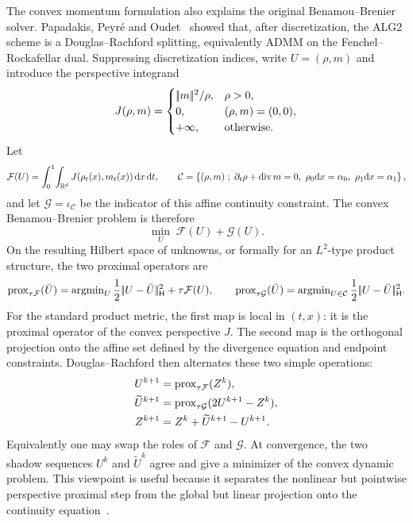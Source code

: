 The convex momentum formulation also explains the original Benamou--Brenier solver. Papadakis, Peyr\'e and Oudet~\cite{FPapPeyOud13} showed that, after discretization, the ALG2 scheme is a Douglas--Rachford splitting, equivalently ADMM on the Fenchel--Rockafellar dual. Suppressing discretization indices, write $U=(\rho,m)$ and introduce the perspective integrand
\[
	J(\rho,m)=
	\begin{cases}
		|\!| m |\!|^2/\rho, & \rho>0,\\
		0, & (\rho,m)=(0,0),\\
		+\infty, & \text{otherwise}.
	\end{cases}
\]
Let
\[
	\mathcal F(U)=\int_0^1\!\int_{\mathbb{R}^d}J(\rho_t(x),m_t(x))\,\mathrm{d} x\,\mathrm{d} t,
	\qquad
	\mathcal C=\left\{ (\rho,m) \;;\; \partial_t\rho+\operatorname{div} m=0,\ \rho_0\mathrm{d} x=\alpha_0,\ \rho_1\mathrm{d} x=\alpha_1 \right\},
\]
and let $\mathcal G=\iota_{\mathcal C}$ be the indicator of this affine continuity constraint. The convex Benamou--Brenier problem is therefore
\[
	\min_U\; \mathcal F(U)+\mathcal G(U).
\]
On the resulting Hilbert space of unknowns, or formally for an $L^2$-type product structure, the two proximal operators are
\[
	\operatorname{prox}_{\tau\mathcal F}(\bar U)
	=
	\operatorname{argmin}_U
	\frac12|\!| U-\bar U |\!|_{\mathsf H}^2+\tau\mathcal F(U),
	\qquad
	\operatorname{prox}_{\tau\mathcal G}(\bar U)
	=
	\operatorname{argmin}_{U\in\mathcal C}
	\frac12|\!| U-\bar U |\!|_{\mathsf H}^2 .
\]
For the standard product metric, the first map is local in $(t,x)$: it is the proximal operator of the convex perspective $J$. The second map is the orthogonal projection onto the affine set defined by the divergence equation and endpoint constraints. Douglas--Rachford then alternates these two simple operations:
\[
	\begin{aligned}
		U^{k+1} &= \operatorname{prox}_{\tau\mathcal F}(Z^k),\\
		\widetilde U^{k+1} &= \operatorname{prox}_{\tau\mathcal G}(2U^{k+1}-Z^k),\\
		Z^{k+1} &= Z^k+\widetilde U^{k+1}-U^{k+1}.
	\end{aligned}
\]
Equivalently one may swap the roles of $\mathcal F$ and $\mathcal G$. At convergence, the two shadow sequences $U^k$ and $\widetilde U^k$ agree and give a minimizer of the convex dynamic problem. This viewpoint is useful because it separates the nonlinear but pointwise perspective proximal step from the global but linear projection onto the continuity equation~\cite{FPapPeyOud13,Eckstein1992}.


